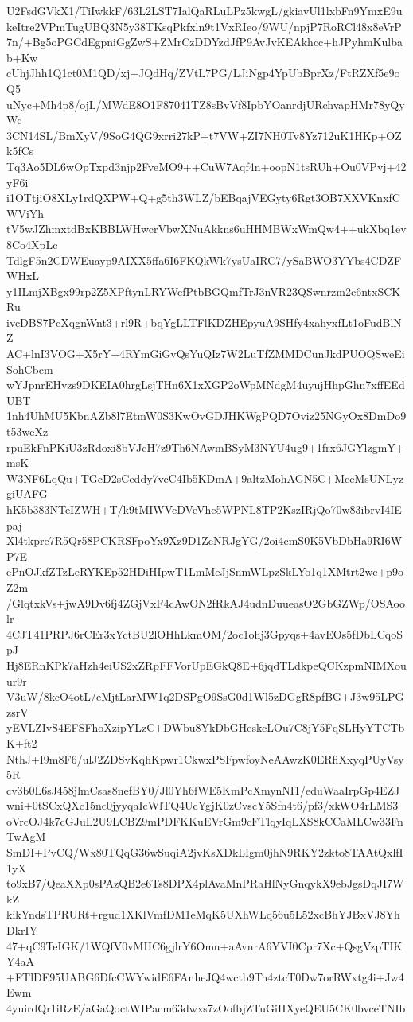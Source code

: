 U2FsdGVkX1/TiIwkkF/63L2LST7IalQaRLuLPz5kwgL/gkiavUl1lxbFn9YmxE9u
keItre2VPmTugUBQ3N5y38TKsqPkfxln9t1VxRIeo/9WU/npjP7RoRCl48x8eVrP
7n/+Bg5oPGCdEgpniGgZwS+ZMrCzDDYzdJfP9AvJvKEAkhcc+hJPyhmKulbab+Kw
cUhjJhh1Q1ct0M1QD/xj+JQdHq/ZVtL7PG/LJiNgp4YpUbBprXz/FtRZXf5e9oQ5
uNyc+Mh4p8/ojL/MWdE8O1F87041TZ8sBvVf8IpbYOanrdjURchvapHMr78yQyWc
3CN14SL/BmXyV/9SoG4QG9xrri27kP+t7VW+ZI7NH0Tv8Yz712uK1HKp+OZk5fCs
Tq3Ao5DL6wOpTxpd3njp2FveMO9++CuW7Aqf4n+oopN1tsRUh+Ou0VPvj+42yF6i
i1OTtjiO8XLy1rdQXPW+Q+g5th3WLZ/bEBqajVEGyty6Rgt3OB7XXVKnxfCWViYh
tV5wJZhmxtdBxKBBLWHwcrVbwXNuAkkns6uHHMBWxWmQw4++ukXbq1ev8Co4XpLc
TdlgF5n2CDWEuayp9AIXX5ffa6I6FKQkWk7ysUaIRC7/ySaBWO3YYbs4CDZFWHxL
y1ILmjXBgx99rp2Z5XPftynLRYWcfPtbBGQmfTrJ3nVR23QSwnrzm2c6ntxSCKRu
ivcDBS7PcXqgnWnt3+rl9R+bqYgLLTFlKDZHEpyuA9SHfy4xahyxfLt1oFudBlNZ
AC+lnI3VOG+X5rY+4RYmGiGvQsYuQIz7W2LuTfZMMDCunJkdPUOQSweEiSohCbcm
wYJpnrEHvzs9DKEIA0hrgLsjTHn6X1xXGP2oWpMNdgM4uyujHhpGhn7xffEEdUBT
1nh4UhMU5KbnAZb8l7EtmW0S3KwOvGDJHKWgPQD7Oviz25NGyOx8DmDo9t53weXz
rpuEkFnPKiU3zRdoxi8bVJcH7z9Th6NAwmBSyM3NYU4ug9+1frx6JGYlzgmY+msK
W3NF6LqQu+TGcD2sCeddy7vcC4Ib5KDmA+9altzMohAGN5C+MccMsUNLyzgiUAFG
hK5b383NTeIZWH+T/k9tMIWVcDVeVhc5WPNL8TP2KszIRjQo70w83ibrvI4IEpaj
Xl4tkpre7R5Qr58PCKRSFpoYx9Xz9D1ZcNRJgYG/2oi4cmS0K5VbDbHa9RI6WP7E
ePnOJkfZTzLeRYKEp52HDiHIpwT1LmMeJjSnmWLpzSkLYo1q1XMtrt2wc+p9oZ2m
/GlqtxkVs+jwA9Dv6fj4ZGjVxF4cAwON2fRkAJ4udnDuueasO2GbGZWp/OSAoolr
4CJT41PRPJ6rCEr3xYctBU2lOHhLkmOM/2oc1ohj3Gpyqs+4avEOs5fDbLCqoSpJ
Hj8ERnKPk7aHzh4eiUS2xZRpFFVorUpEGkQ8E+6jqdTLdkpeQCKzpmNIMXouur9r
V3uW/8kcO4otL/eMjtLarMW1q2DSPgO9SsG0d1Wl5zDGgR8pfBG+J3w95LPGzsrV
yEVLZIvS4EFSFhoXzipYLzC+DWbu8YkDbGHeskcLOu7C8jY5FqSLHyYTCTbK+ft2
NthJ+I9m8F6/ulJ2ZDSvKqhKpwr1CkwxPSFpwfoyNeAAwzK0ERfiXxyqPUyVsy5R
cv3b0L6sJ458jlmCsas8nefBY0/Jl0Yh6fWE5KmPcXmynNI1/eduWaaIrpGp4EZJ
wni+0tSCxQXc15nc0jyyqaIcWlTQ4UcYgjK0zCvscY5Sfn4t6/pf3/xkWO4rLMS3
oVrcOJ4k7cGJuL2U9LCBZ9mPDFKKuEVrGm9cFTlqyIqLXS8kCCaMLCw33FnTwAgM
SmDI+PvCQ/Wx80TQqG36wSuqiA2jvKsXDkLIgm0jhN9RKY2zkto8TAAtQxlfI1yX
to9xB7/QeaXXp0sPAzQB2e6Ts8DPX4plAvaMnPRaHlNyGnqykX9ebJgsDqJI7WkZ
kikYndsTPRURt+rgud1XKlVmfDM1eMqK5UXhWLq56u5L52xcBhYJBxVJ8YhDkrIY
47+qC9TeIGK/1WQfV0vMHC6gjlrY6Omu+aAvnrA6YVI0Cpr7Xc+QsgVzpTIKY4aA
+FTlDE95UABG6DfcCWYwidE6FAnheJQ4wctb9Tn4ztcT0Dw7orRWxtg4i+Jw4Ewm
4yuirdQr1iRzE/aGaQoctWIPacm63dwxs7zOofbjZTuGiHXyeQEU5CK0bvceTNIb
